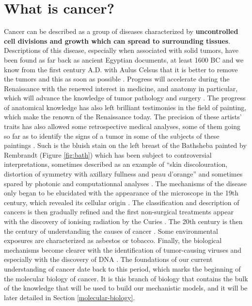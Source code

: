 \documentclass[a4paper,12pt,twoside,onecolumn,openright,final,oldfontcommands]{memoir}
\begin{document}
\section{What is cancer?}\label{what-is-cancer}

Cancer can be described as a group of diseases characterized by
\textbf{uncontrolled cell divisions and growth which can spread to
surrounding tissues}. Descriptions of this disease, especially when
associated with solid tumors, have been found as far back as ancient
Egyptian documents, at least 1600 BC and we know from the first century
A.D. with Aulus Celsus that it is better to remove the tumors and this
as soon as possible \citep{hajdu2011note}. Progress will accelerate
during the Renaissance with the renewed interest in medicine, and
anatomy in particular, which will advance the knowledge of tumor
pathology and surgery \citep{hajdu2011note2}. The progress of anatomical
knowledge has also left brilliant testimonies in the field of painting,
which make the renown of the Renaissance today. The precision of these
artists' traits has also allowed some retrospective medical analyses,
some of them going so far as to identify the signs of a tumor in some of
the subjects of these paintings \citep{bianucci2018earliest}. Such is
the bluish stain on the left breast of the Bathsheba painted by
Rembrandt (Figure \ref{fig:bath}) which has been subject to
controversial interpretations, sometimes described as an example of
``skin discolouration, distortion of symmetry with axillary fullness and
peau d'orange'' \citep{braithwaite1983rembrandt} and sometimes spared by
photonic and computationnal analyses \citep{heijblom2014monte}. The
mechanisms of the disease only began to be elucidated with the
appearance of the microscope in the 19th century, which revealed its
cellular origin \citep{hajdu2012note}. The classification and
description of cancers is then gradually refined and the first
non-surgical treatments appear with the discovery of ionising radiation
by the Curies \citep{hajdu2012note2}. The 20th century is then the
century of understanding the causes of cancer
\citep{hajdu2013note, hajdu2013note2}. Some environmental exposures are
characterized as asbestos or tobacco. Finally, the biological mechanisms
become clearer with the identification of tumor-causing viruses and
especially with the discovery of DNA \citep{watson1953molecular}. The
foundations of our current understanding of cancer date back to this
period, which marks the beginning of the molecular biology of cancer. It
is this branch of biology that contains the bulk of the knowledge that
will be used to build our mechanistic models, and it will be later
detailed in Section \ref{molecular-biology}.
\end{document}
